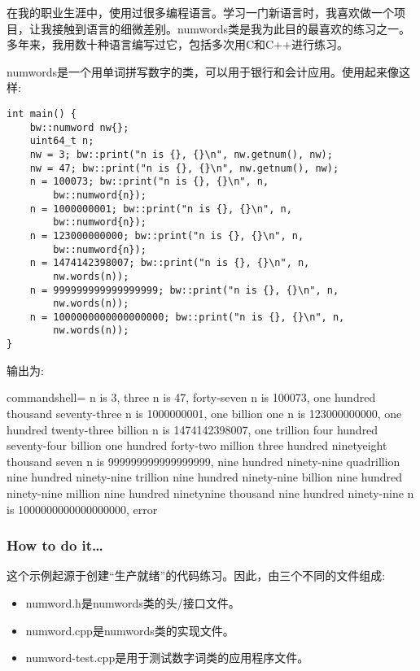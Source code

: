 
在我的职业生涯中，使用过很多编程语言。学习一门新语言时，我喜欢做一个项目，让我接触到语言的细微差别。numwords类是我为此目的最喜欢的练习之一。多年来，我用数十种语言编写过它，包括多次用C和C++进行练习。

numwords是一个用单词拼写数字的类，可以用于银行和会计应用。使用起来像这样:

\begin{lstlisting}[style=styleCXX]
int main() {
	bw::numword nw{};
	uint64_t n;
	nw = 3; bw::print("n is {}, {}\n", nw.getnum(), nw);
	nw = 47; bw::print("n is {}, {}\n", nw.getnum(), nw);
	n = 100073; bw::print("n is {}, {}\n", n,
		bw::numword{n});
	n = 1000000001; bw::print("n is {}, {}\n", n,
		bw::numword{n});
	n = 123000000000; bw::print("n is {}, {}\n", n,
		bw::numword{n});
	n = 1474142398007; bw::print("n is {}, {}\n", n,
		nw.words(n));
	n = 999999999999999999; bw::print("n is {}, {}\n", n,
		nw.words(n));
	n = 1000000000000000000; bw::print("n is {}, {}\n", n,
		nw.words(n));
}
\end{lstlisting}

输出为:

\begin{tcblisting}{commandshell={}}
n is 3, three
n is 47, forty-seven
n is 100073, one hundred thousand seventy-three
n is 1000000001, one billion one
n is 123000000000, one hundred twenty-three billion
n is 1474142398007, one trillion four hundred seventy-four
billion one hundred forty-two million three hundred ninetyeight thousand seven
n is 999999999999999999, nine hundred ninety-nine quadrillion
nine hundred ninety-nine trillion nine hundred ninety-nine
billion nine hundred ninety-nine million nine hundred ninetynine thousand nine hundred ninety-nine
n is 1000000000000000000, error
\end{tcblisting}

\subsubsection{How to do it…}

这个示例起源于创建“生产就绪”的代码练习。因此，由三个不同的文件组成:

\begin{itemize}
\item 
numword.h是numwords类的头/接口文件。

\item 
numword.cpp是numwords类的实现文件。

\item 
numword-test.cpp是用于测试数字词类的应用程序文件。
\end{itemize}

